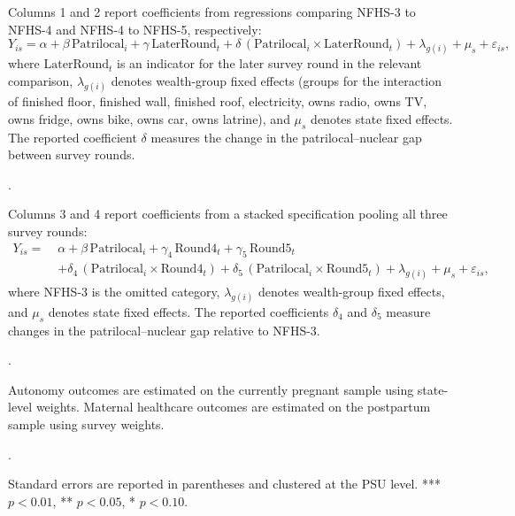 \documentclass[12pt]{article}
\begin{document}
\begin{table}[!htbp]
\begin{threeparttable}[t]
\begin{tablenotes}
\item Columns 1 and 2 report coefficients from regressions comparing NFHS-3 to NFHS-4 and NFHS-4 to NFHS-5, respectively: 
\[
Y_{is} = \alpha + \beta \,\text{Patrilocal}_i + \gamma \,\text{LaterRound}_t
+ \delta \,(\text{Patrilocal}_i \times \text{LaterRound}_t)
+ \lambda_{g(i)} + \mu_s + \varepsilon_{is},
\]
where $\text{LaterRound}_t$ is an indicator for the later survey round in the relevant comparison, $\lambda_{g(i)}$ denotes wealth-group fixed effects (groups for the interaction of finished floor, finished wall, finished roof, electricity, owns radio, owns TV, owns fridge, owns bike, owns car, owns latrine), and $\mu_s$ denotes state fixed effects. The reported coefficient $\delta$ measures the change in the patrilocal--nuclear gap between survey rounds.
\item . 
\item Columns 3 and 4 report coefficients from a stacked specification pooling all three survey rounds:
\[
\begin{aligned}
Y_{is} =\;& \alpha 
+ \beta \,\text{Patrilocal}_i
+ \gamma_4 \,\text{Round4}_t
+ \gamma_5 \,\text{Round5}_t \\
&+ \delta_4 \,(\text{Patrilocal}_i \times \text{Round4}_t)
+ \delta_5 \,(\text{Patrilocal}_i \times \text{Round5}_t)
+ \lambda_{g(i)} + \mu_s + \varepsilon_{is},
\end{aligned}
\]
where NFHS-3 is the omitted category, $\lambda_{g(i)}$ denotes wealth-group fixed effects, and $\mu_s$ denotes state fixed effects. The reported coefficients $\delta_4$ and $\delta_5$ measure changes in the patrilocal--nuclear gap relative to NFHS-3.
\item .
\item Autonomy outcomes are estimated on the currently pregnant sample using state-level weights. Maternal healthcare outcomes are estimated on the postpartum sample using survey weights.
\item .
\item Standard errors are reported in parentheses and clustered at the PSU level. *** $p<0.01$, ** $p<0.05$, * $p<0.10$.

        \end{tablenotes}
    \end{threeparttable}
\end{table}
\end{document}
